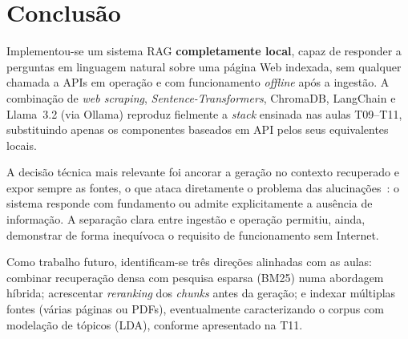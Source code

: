 \documentclass[]{ceurart}
\begin{document}
\section{Conclusão}

Implementou-se um sistema RAG \textbf{completamente local}, capaz de responder a
perguntas em linguagem natural sobre uma página Web indexada, sem qualquer
chamada a APIs em operação e com funcionamento \emph{offline} após a ingestão. A
combinação de \emph{web scraping}, \emph{Sentence-Transformers}, ChromaDB,
LangChain e Llama~3.2 (via Ollama) reproduz fielmente a \emph{stack} ensinada nas
aulas T09--T11, substituindo apenas os componentes baseados em API pelos seus
equivalentes locais.

A decisão técnica mais relevante foi ancorar a geração no contexto recuperado e
expor sempre as fontes, o que ataca diretamente o problema das
alucinações~\cite{ji2023hallucination}: o sistema responde com fundamento ou
admite explicitamente a ausência de informação. A separação clara entre ingestão
e operação permitiu, ainda, demonstrar de forma inequívoca o requisito de
funcionamento sem Internet.

Como trabalho futuro, identificam-se três direções alinhadas com as aulas:
combinar recuperação densa com pesquisa esparsa (BM25) numa abordagem híbrida;
acrescentar \emph{reranking} dos \emph{chunks} antes da geração; e indexar
múltiplas fontes (várias páginas ou PDFs), eventualmente caracterizando o corpus
com modelação de tópicos (LDA), conforme apresentado na T11.
\end{document}
